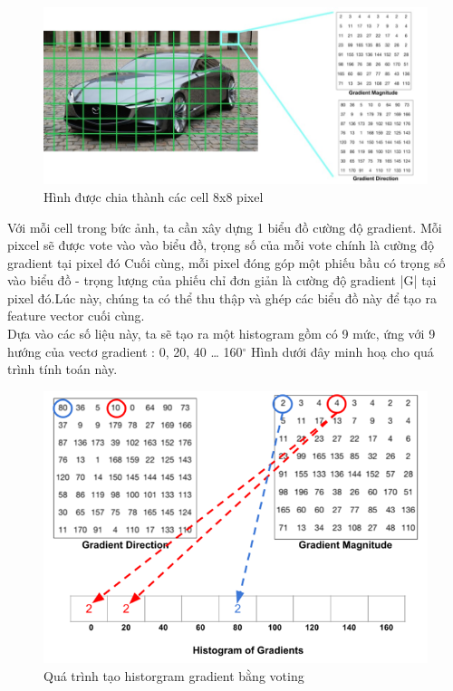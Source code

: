 \documentclass[10pt,conference,a4paper]{IEEEtran}
\makeatletter
\def\ScaleIfNeeded{\ifdim\Gin@nat@width>\linewidth\linewidth\else\Gin@nat@width\fi}
\makeatother
\begin{document}
\begin{figure}[!htp]
	\centering
	\includegraphics[width=\ScaleIfNeeded]{"gradient vector2"}
	\caption{Hình được chia thành các cell 8x8 pixel}
	\label{fig:gradient-vector2}
\end{figure}

Với mỗi cell trong bức ảnh, ta cần xây dựng 1 biểu đồ cường độ gradient. Mỗi pixcel sẽ được vote vào vào biểu đồ, trọng số của mỗi vote chính là cường độ gradient tại pixel đó Cuối cùng, mỗi pixel đóng góp một phiếu bầu có trọng số vào biểu đồ - trọng lượng của phiếu chỉ đơn giản là cường độ gradient |G| tại pixel đó.Lúc này, chúng ta có thể thu thập và ghép các biểu đồ này để tạo ra feature vector cuối cùng.\\
Dựa vào các số liệu này, ta sẽ tạo ra một histogram gồm có 9 mức, ứng với 9 hướng của vectơ gradient : 0, 20, 40 … 160$^\circ $  Hình dưới đây minh hoạ cho quá trình tính toán này.\\
\begin{figure}[ht]
	\centering
	\includegraphics[width=\ScaleIfNeeded]{"histogram gradient"}
	\caption{Quá trình tạo historgram gradient bằng voting}
	\label{fig:histogram-gradient}
\end{figure}
\end{document}
